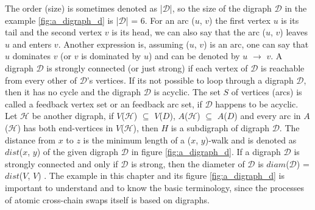 The order (size) is sometimes denoted as |$\mathcal{D}$|, so the size of the digraph $\mathcal{D}$ in the example \ref{fig:a_digraph_d} is |$\mathcal{D}$| = 6. For an arc ($u$, $v$) the first vertex $u$ is its tail and the second vertex $v$ is its head, we can also say that the arc ($u$, $v$) leaves $u$ and enters $v$. Another expression is, assuming ($u$, $v$) is an arc, one can say that $u$ dominates $v$ (or $v$ is dominated by $u$) and can be denoted by $u$ $\rightarrow$ $v$. A digraph $\mathcal{D}$ is strongly connected (or just strong) if each vertex of $\mathcal{D}$ is reachable from every other of $\mathcal{D}$'s vertices.  If its not possible to loop through a digraph $\mathcal{D}$, then it has no cycle and the digraph $\mathcal{D}$ is acyclic. The set $S$ of vertices (arcs) is called a feedback vertex set or an feedback arc set, if $\mathcal{D}$ happens to be acyclic. Let $\mathcal{H}$ be another digraph, if $V$($\mathcal{H}$) $\subseteq$ $V$($D$), $A$($\mathcal{H}$) $\subseteq$ $A$($D$) and every arc in $A$($\mathcal{H}$) has both end-vertices in $V$($\mathcal{H}$), then $H$ is a subdigraph of digraph $\mathcal{D}$. The distance from $x$ to $z$ is the minimum length of a ($x$, $y$)-walk and is denoted as $dist$($x$, $y$) of the given digraph $\mathcal{D}$ in figure \ref{fig:a_digraph_d}. If a digraph $\mathcal{D}$ is strongly connected and only if $\mathcal{D}$ is strong, then the diameter of $\mathcal{D}$ is $diam$($\mathcal{D}$) = $dist$($V$, $V$) \cite{bang2007theory}. The example in this chapter and its figure \ref{fig:a_digraph_d} is important to understand and to know the basic terminology, since the processes of atomic cross-chain swaps itself is based on digraphs.

\clearpage

